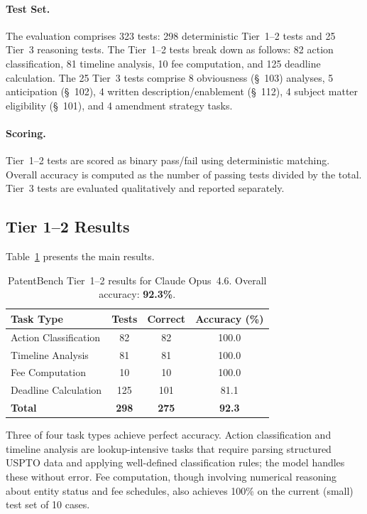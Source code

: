 \documentclass[11pt]{article}
\begin{document}
\paragraph{Test Set.} The evaluation comprises 323 tests: 298 deterministic Tier~1--2 tests and 25 Tier~3 reasoning tests. The Tier~1--2 tests break down as follows: 82 action classification, 81 timeline analysis, 10 fee computation, and 125 deadline calculation. The 25 Tier~3 tests comprise 8 obviousness (\S~103) analyses, 5 anticipation (\S~102), 4 written description/enablement (\S~112), 4 subject matter eligibility (\S~101), and 4 amendment strategy tasks.

\paragraph{Scoring.} Tier~1--2 tests are scored as binary pass/fail using deterministic matching. Overall accuracy is computed as the number of passing tests divided by the total. Tier~3 tests are evaluated qualitatively and reported separately.

\subsection{Tier 1--2 Results}
\label{sec:results_tier12}

Table~\ref{tab:main_results} presents the main results.

\begin{table}[H]
\centering
\caption{PatentBench Tier~1--2 results for Claude Opus~4.6. Overall accuracy: \textbf{92.3\%}.}
\label{tab:main_results}
\begin{tabular}{@{}lccc@{}}
\toprule
\textbf{Task Type} & \textbf{Tests} & \textbf{Correct} & \textbf{Accuracy (\%)} \\
\midrule
Action Classification & 82 & 82 & 100.0 \\
Timeline Analysis & 81 & 81 & 100.0 \\
Fee Computation & 10 & 10 & 100.0 \\
Deadline Calculation & 125 & \phantom{0}101\phantom{.0} & \phantom{0}81.1 \\
\midrule
\textbf{Total} & \textbf{298} & \textbf{275\phantom{.0}} & \textbf{\phantom{0}92.3} \\
\bottomrule
\end{tabular}
\end{table}

Three of four task types achieve perfect accuracy. Action classification and timeline analysis are lookup-intensive tasks that require parsing structured USPTO data and applying well-defined classification rules; the model handles these without error. Fee computation, though involving numerical reasoning about entity status and fee schedules, also achieves 100\% on the current (small) test set of 10 cases.
\end{document}
